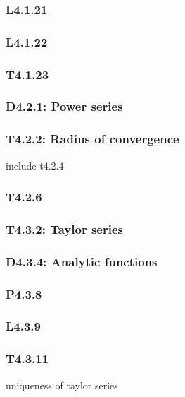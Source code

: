 \documentclass{article}
\begin{document}
\begin{multicols*}{3}
\subsubsection*{L4.1.21}

\subsubsection*{L4.1.22}

\subsubsection*{T4.1.23}

\newcolumn

\subsubsection*{D4.2.1: Power series}

\subsubsection*{T4.2.2: Radius of convergence}
include t4.2.4

\subsubsection*{T4.2.6}

\newcolumn

\subsubsection*{T4.3.2: Taylor series}

\subsubsection*{D4.3.4: Analytic functions}

\subsubsection*{P4.3.8}

\subsubsection*{L4.3.9}

\subsubsection*{T4.3.11}
uniqueness of taylor series


\end{multicols*}
\end{document}
